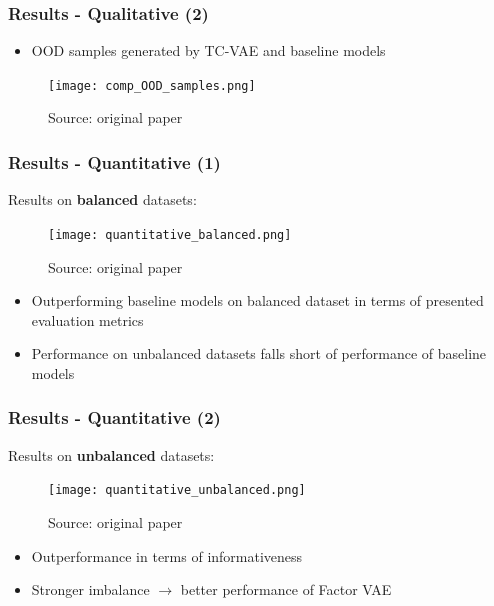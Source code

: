 \documentclass{beamer}
\theoremstyle{definition}
\begin{document}
    \begin{frame}
      \frametitle{Results - Qualitative (2)}
      \begin{itemize}
        \item OOD samples generated by TC-VAE and baseline models
      \end{itemize}
      \begin{figure}
        \centering
        \texttt{[image: comp\_OOD\_samples.png]}
        \captionsetup{justification=centering}
        \caption*{\tiny{Source: original paper}}
      \end{figure}
    \end{frame}

    \begin{frame}
      \frametitle{Results - Quantitative (1)}
      Results on \textbf{balanced} datasets:
      \begin{figure}
        \centering
        \texttt{[image: quantitative\_balanced.png]}
        \captionsetup{justification=centering}
        \caption*{\tiny{Source: original paper}}
      \end{figure}
      \begin{itemize}
        \item Outperforming baseline models on balanced dataset in terms of presented evaluation metrics
        \item Performance on unbalanced datasets falls short of performance of baseline models
      \end{itemize}
    \end{frame}

    \begin{frame}
      \frametitle{Results - Quantitative (2)}
      Results on \textbf{unbalanced} datasets:
      \begin{figure}
        \centering
        \texttt{[image: quantitative\_unbalanced.png]}
        \captionsetup{justification=centering}
        \caption*{\tiny{Source: original paper}}
      \end{figure}
      \begin{itemize}
        \item Outperformance in terms of informativeness
        \item Stronger imbalance $\rightarrow$ better performance of Factor VAE
      \end{itemize}
    \end{frame}
\end{document}
